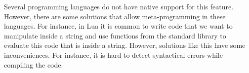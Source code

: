 \documentclass[english]{llncs}
\begin{document}
Several programming languages do not have native support for this feature.
However, there are some solutions that allow meta-programming in these languages.
For instance, in Lua it is common to write code that we want to manipulate
inside a string and use functions from the standard library to evaluate this
code that is inside a string.
However, solutions like this have some inconveniences.
For instance, it is hard to detect syntactical errors while compiling the code.




\end{document}
